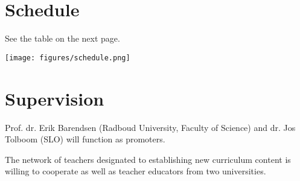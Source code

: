 
\section{Schedule}\label{sec:Schedule}

See the table on the next page.

\begin{sidewaysfigure}
\texttt{[image: figures/schedule.png]}
\end{sidewaysfigure}


\section{Supervision}\label{sec:Supervision}

Prof. dr. Erik Barendsen (Radboud University, Faculty of Science) and dr. Jos Tolboom (SLO) will function as promoters.


The network of teachers designated to establishing new curriculum content is willing to cooperate as well as teacher educators from two universities.
